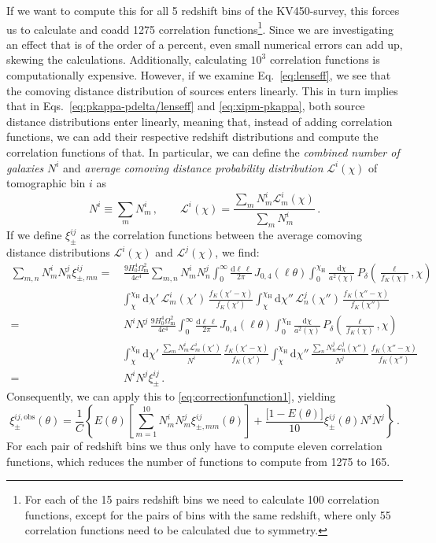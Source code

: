 \documentclass[referee]{aa} %
\renewcommand{\[}{\begin{equation}}
\renewcommand{\]}{\end{equation}}
\renewcommand{\rm}{\mathrm}
\begin{document}
If we want to compute this for all 5 redshift bins of the KV450-survey, this forces us to calculate and coadd 1275 correlation functions\footnote{For each of the 15 pairs redshift bins we need to calculate 100 correlation functions, except for the pairs of bins with the same redshift, where only 55 correlation functions need to be calculated due to symmetry.}. Since we are investigating an effect that is of the order of a percent, even small numerical errors can add up, skewing the calculations. Additionally, calculating $10^3$ correlation functions is computationally expensive. However, if we examine Eq.~\eqref{eq:lenseff}, we see that the comoving distance distribution of sources enters linearly. This in turn implies that in Eqs.~\eqref{eq:pkappa-pdelta/lenseff} and \eqref{eq:xipm-pkappa}, both source distance distributions enter linearly, meaning that, instead of adding correlation functions, we can add their respective redshift distributions and compute the correlation functions of that. In particular, we can define the \textit{combined number of galaxies} $N^i$ and \textit{average comoving distance probability distribution} $\mathcal{L}^i(\chi)$ of tomographic bin $i$ as \[
N^i\equiv\sum_m N_m^i\, , \qquad \mathcal{L}^i(\chi) = \frac{\sum_m N_m^i \mathcal{L}_m^i(\chi)}{\sum_m N_m^i} \, .
\]
If we define $\xi^{ij}_\pm$ as the correlation functions between the average comoving distance distributions $\mathcal{L}^i(\chi)$ and $\mathcal{L}^j(\chi)$, we find: \begin{align}
\sum_{m,n}N_m^iN_n^j\xi^{ij}_{\pm,mn} = & \, \frac{9 H_0^4\Omega_{\rm m}^2}{4c^4} \sum_{m,n} N_m^i N_n^j \int_0^\infty \frac{{\rm d}\ell\,\ell}{2\pi}\, J_{0,4}(\ell\theta) \int_0^{\chi_{\rm{H}}} \frac{{\rm d}\chi}{a^2(\chi)}\, P_\delta\left(\frac{\ell}{f_K(\chi)},\chi\right) \\
& \int_\chi^{\chi_{\rm{H}}} {\rm d}\chi' \, \mathcal{L}^i_m(\chi') \, \frac{f_K(\chi'-\chi)}{f_K(\chi')}
\int_\chi^{\chi_{\rm{H}}} {\rm d}\chi'' \, \mathcal{L}^j_n(\chi'') \, \frac{f_K(\chi''-\chi)}{f_K(\chi'')} \\
 = & \,N^i N^j \, \frac{9 H_0^4\Omega_{\rm m}^2}{4c^4} \int_0^\infty \frac{{\rm d}\ell\,\ell}{2\pi}\, J_{0,4}(\ell\theta) \int_0^{\chi_{\rm{H}}} \frac{{\rm d}\chi}{a^2(\chi)}\, P_\delta\left(\frac{\ell}{f_K(\chi)},\chi\right) \\
& \int_\chi^{\chi_{\rm{H}}} {\rm d}\chi' \, \frac{\sum_m N_m^i \mathcal{L}^i_m(\chi')}{N^i} \, \frac{f_K(\chi'-\chi)}{f_K(\chi')}
\int_\chi^{\chi_{\rm{H}}} {\rm d}\chi'' \, \frac{\sum_n N_n^j \mathcal{L}^j_n(\chi'')}{N^j}  \, \frac{f_K(\chi''-\chi)}{f_K(\chi'')} \\
 = & \, N^iN^j\xi^{ij}_\pm\, .
\end{align}
Consequently, we can apply this to \eqref{eq:correctionfunction1}, yielding
\begin{equation}
\xi_{\pm}^{ij,\rm{obs}}(\theta) = \frac{1}{C}\left\{ E(\theta)\left[\sum_{m=1}^{10} N_m^iN_m^j \xi_{\pm,mm}^{ij}(\theta)\right] +\frac{\big[1-E(\theta)\big]}{10}\xi_\pm^{ij}(\theta)N^iN^j\right\}\, .
\label{eq:correctionfunction2}
\end{equation}
For each pair of redshift bins we thus only have to compute eleven correlation functions, which reduces the number of functions to compute from 1275 to 165.
\end{document}
